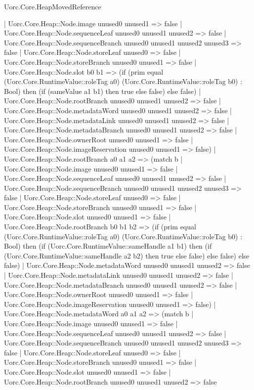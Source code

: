 \begin{lexlean}{Uorc.Core.HeapMovedReference}
\begin{semanticmodule}
{      | Uorc.Core.Heap::Node.image unused0 unused1 => false
      | Uorc.Core.Heap::Node.sequenceLeaf unused0 unused1 unused2 => false
      | Uorc.Core.Heap::Node.sequenceBranch unused0 unused1 unused2 unused3 => false
      | Uorc.Core.Heap::Node.storeLeaf unused0 => false
      | Uorc.Core.Heap::Node.storeBranch unused0 unused1 => false
      | Uorc.Core.Heap::Node.slot b0 b1 => (if (prim equal (Uorc.Core.RuntimeValue::roleTag a0) (Uorc.Core.RuntimeValue::roleTag b0) : Bool) then (if (sameValue a1 b1) then true else false) else false)
      | Uorc.Core.Heap::Node.rootBranch unused0 unused1 unused2 => false
      | Uorc.Core.Heap::Node.metadataWord unused0 unused1 unused2 => false
      | Uorc.Core.Heap::Node.metadataLink unused0 unused1 unused2 => false
      | Uorc.Core.Heap::Node.metadataBranch unused0 unused1 unused2 => false
      | Uorc.Core.Heap::Node.ownerRoot unused0 unused1 => false
      | Uorc.Core.Heap::Node.imageReservation unused0 unused1 => false)
    | Uorc.Core.Heap::Node.rootBranch a0 a1 a2 => (match b
      | Uorc.Core.Heap::Node.image unused0 unused1 => false
      | Uorc.Core.Heap::Node.sequenceLeaf unused0 unused1 unused2 => false
      | Uorc.Core.Heap::Node.sequenceBranch unused0 unused1 unused2 unused3 => false
      | Uorc.Core.Heap::Node.storeLeaf unused0 => false
      | Uorc.Core.Heap::Node.storeBranch unused0 unused1 => false
      | Uorc.Core.Heap::Node.slot unused0 unused1 => false
      | Uorc.Core.Heap::Node.rootBranch b0 b1 b2 => (if (prim equal (Uorc.Core.RuntimeValue::roleTag a0) (Uorc.Core.RuntimeValue::roleTag b0) : Bool) then (if (Uorc.Core.RuntimeValue::sameHandle a1 b1) then (if (Uorc.Core.RuntimeValue::sameHandle a2 b2) then true else false) else false) else false)
      | Uorc.Core.Heap::Node.metadataWord unused0 unused1 unused2 => false
      | Uorc.Core.Heap::Node.metadataLink unused0 unused1 unused2 => false
      | Uorc.Core.Heap::Node.metadataBranch unused0 unused1 unused2 => false
      | Uorc.Core.Heap::Node.ownerRoot unused0 unused1 => false
      | Uorc.Core.Heap::Node.imageReservation unused0 unused1 => false)
    | Uorc.Core.Heap::Node.metadataWord a0 a1 a2 => (match b
      | Uorc.Core.Heap::Node.image unused0 unused1 => false
      | Uorc.Core.Heap::Node.sequenceLeaf unused0 unused1 unused2 => false
      | Uorc.Core.Heap::Node.sequenceBranch unused0 unused1 unused2 unused3 => false
      | Uorc.Core.Heap::Node.storeLeaf unused0 => false
      | Uorc.Core.Heap::Node.storeBranch unused0 unused1 => false
      | Uorc.Core.Heap::Node.slot unused0 unused1 => false
      | Uorc.Core.Heap::Node.rootBranch unused0 unused1 unused2 => false
}
\end{semanticmodule}
\end{lexlean}
